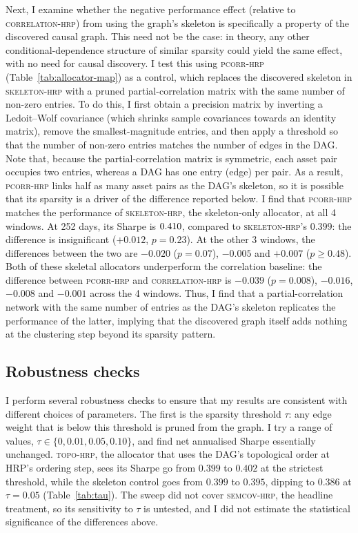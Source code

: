 \documentclass[11pt, a4paper]{report}
\newcommand{\corrhrp}{\textsc{correlation-hrp}}
\newcommand{\skelhrp}{\textsc{skeleton-hrp}}
\newcommand{\semcovhrp}{\textsc{semcov-hrp}}
\newcommand{\topohrp}{\textsc{topo-hrp}}
\newcommand{\pcorrhrp}{\textsc{pcorr-hrp}}
\begin{document}
Next, I examine whether the negative performance effect (relative to \corrhrp{}) from using the graph's skeleton is specifically a property of the discovered causal graph. This need not be the case: in theory, any other conditional-dependence structure of similar sparsity could yield the same effect, with no need for causal discovery.
I test this using \pcorrhrp{} (Table~\ref{tab:allocator-map}) as a control, which replaces the discovered skeleton in \skelhrp{} with a pruned partial-correlation
matrix with the same number of non-zero entries. 
To do this, I first obtain a 
precision matrix by inverting a Ledoit--Wolf covariance (which shrinks sample covariances towards an identity matrix), remove the smallest-magnitude entries, and then apply a threshold so that the number of non-zero entries matches the number of edges in the DAG.
Note that, because the partial-correlation matrix is symmetric, each asset pair occupies
two entries, whereas a DAG has one entry (edge) per pair. As a result, \pcorrhrp{} links half as many asset pairs as the DAG's skeleton, so it is possible that its sparsity is a driver of the difference reported below.
I find that \pcorrhrp{} matches the performance of \skelhrp{}, the skeleton-only allocator, at all 4 windows. At 252 days, its Sharpe is $0.410$,
compared to \skelhrp{}'s $0.399$: the difference is insignificant ($+0.012$, $p=0.23$). 
At the other 3 windows, the
differences between the two are $-0.020$ ($p=0.07$), $-0.005$ and $+0.007$ ($p \geq
0.48$). 
Both of these skeletal allocators underperform the correlation baseline: 
the difference between \pcorrhrp{} and \corrhrp{} is $-0.039$ ($p=0.008$), $-0.016$, $-0.008$ and $-0.001$ across the 4
windows. 
Thus, I find that a partial-correlation network with the same number of entries as the DAG's skeleton replicates the performance of the latter, implying that the discovered graph itself adds nothing at the clustering step beyond its sparsity pattern.

\subsection{Robustness checks}
\label{sec:robustness}

I perform several robustness checks to ensure that my results are consistent with different choices of parameters. The first is the sparsity threshold $\tau$: any edge weight that is below this threshold is pruned from the graph. I try a range of values, $\tau\in\{0,0.01,0.05,0.10\}$, and find net annualised Sharpe essentially unchanged. \topohrp{}, the allocator that uses the DAG's topological order at HRP's ordering step, sees its Sharpe go from $0.399$ to $0.402$ at the strictest threshold, while the skeleton control goes from $0.399$ to $0.395$, dipping to $0.386$ at $\tau=0.05$ (Table~\ref{tab:tau}).
The sweep did not cover \semcovhrp{}, the headline treatment, so its sensitivity to $\tau$ is untested, and I did not estimate the statistical significance of the differences above.
\end{document}
